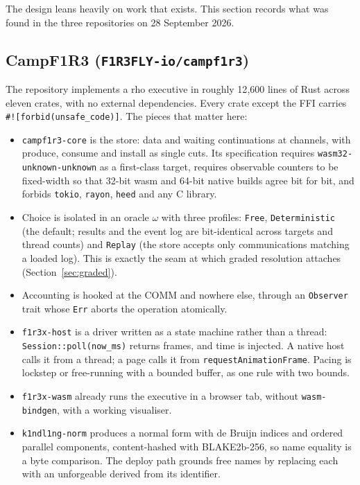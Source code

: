\documentclass[11pt]{article}
\theoremstyle{definition}
\theoremstyle{remark}
\newcommand{\Camp}{CampF1R3}
\newcommand{\code}[1]{\texttt{#1}}
\begin{document}
The design leans heavily on work that exists. This section records what was found
in the three repositories on 28 September 2026.

\subsection{\Camp{} (\code{F1R3FLY-io/campf1r3})}

The repository implements a rho executive in roughly 12{,}600 lines of Rust across
eleven crates, with no external dependencies. Every crate except the FFI carries
\code{\#![forbid(unsafe\_code)]}. The pieces that matter here:

\begin{itemize}[nosep]
\item \code{campf1r3-core} is the store: data and waiting continuations at channels,
  with produce, consume and install as single cuts. Its specification requires
  \code{wasm32-unknown-unknown} as a first-class target, requires observable
  counters to be fixed-width so that 32-bit wasm and 64-bit native builds agree bit
  for bit, and forbids \code{tokio}, \code{rayon}, \code{heed} and any C library.
\item Choice is isolated in an oracle $\omega$ with three profiles:
  \code{Free}, \code{Deterministic} (the default; results and the event log are
  bit-identical across targets and thread counts) and \code{Replay} (the store
  accepts only communications matching a loaded log). This is exactly the seam at
  which graded resolution attaches (Section~\ref{sec:graded}).
\item Accounting is hooked at the COMM and nowhere else, through an
  \code{Observer} trait whose \code{Err} aborts the operation atomically.
\item \code{f1r3x-host} is a driver written as a state machine rather than a
  thread: \code{Session::poll(now\_ms)} returns frames, and time is injected. A
  native host calls it from a thread; a page calls it from
  \code{requestAnimationFrame}. Pacing is lockstep or free-running with a bounded
  buffer, as one rule with two bounds.
\item \code{f1r3x-wasm} already runs the executive in a browser tab, without
  \code{wasm-bindgen}, with a working visualiser.
\item \code{k1ndl1ng-norm} produces a normal form with de Bruijn indices and ordered
  parallel components, content-hashed with BLAKE2b-256, so name equality is a byte
  comparison. The deploy path grounds free names by replacing each with an
  unforgeable derived from its identifier.
\end{itemize}
\end{document}
